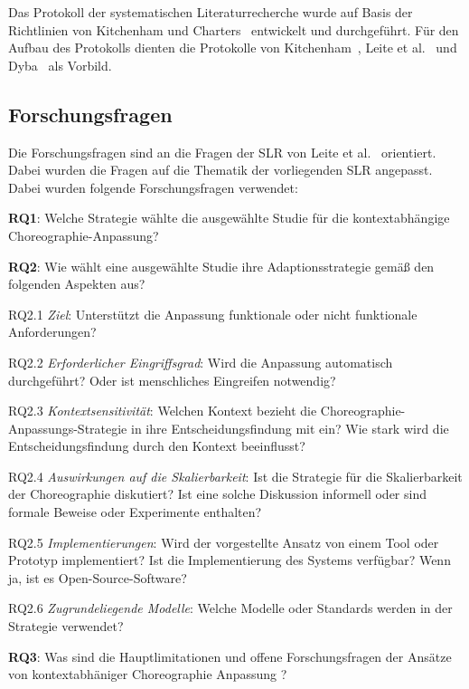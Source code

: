 \documentclass[conference,compsoc,ngerman]{IEEEtran}
\begin{document}
Das Protokoll der systematischen Literaturrecherche wurde auf Basis der Richtlinien von Kitchenham und Charters~\cite{keele2007guidelines} entwickelt und durchgeführt. Für den Aufbau des Protokolls dienten die Protokolle von Kitchenham~\cite{kitchenham2009systematic}, Leite et al.~\cite{leite2013systematic} und Dyba~\cite{dybaa2008empirical} als Vorbild.
\subsection{Forschungsfragen}
Die Forschungsfragen sind an die Fragen der SLR von Leite et al.~\cite{leite2013systematic} orientiert. Dabei wurden die Fragen auf die Thematik der vorliegenden SLR angepasst.
Dabei wurden folgende Forschungsfragen verwendet:


\textbf{RQ1}: Welche Strategie wählte die ausgewählte Studie für die kontextabhängige Choreographie-Anpassung? 

\textbf{RQ2}: Wie wählt eine ausgewählte Studie ihre Adaptionsstrategie gemäß den folgenden Aspekten aus?

RQ2.1 \textit{Ziel}: Unterstützt die Anpassung funktionale oder nicht funktionale Anforderungen?

RQ2.2 \textit{Erforderlicher Eingriffsgrad}: Wird die Anpassung automatisch durchgeführt? Oder ist menschliches Eingreifen notwendig?

RQ2.3 \textit{Kontextsensitivität}: Welchen Kontext bezieht die Choreographie-Anpassungs-Strategie in ihre Entscheidungsfindung mit ein? Wie stark wird die Entscheidungsfindung durch den Kontext beeinflusst?

RQ2.4 \textit{Auswirkungen auf die Skalierbarkeit}: Ist die Strategie für die Skalierbarkeit der Choreographie diskutiert? Ist eine solche Diskussion informell oder sind formale Beweise oder Experimente enthalten?

RQ2.5 \textit{Implementierungen}: Wird der vorgestellte Ansatz von einem Tool oder Prototyp implementiert? Ist die Implementierung des Systems verfügbar? Wenn ja, ist es Open-Source-Software?

RQ2.6 \textit{Zugrundeliegende Modelle}: Welche Modelle oder Standards werden in der Strategie verwendet?

\textbf{RQ3}: Was sind die Hauptlimitationen und offene Forschungsfragen der Ansätze von \glqq kontextabhäniger Choreographie Anpassung \grqq?
\end{document}
